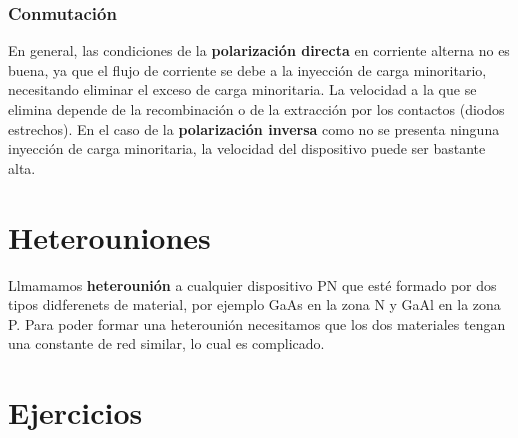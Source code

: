 \subsubsection{Conmutación}

En general, las condiciones de la \textbf{polarización directa} en corriente alterna no es buena, ya que el flujo de corriente se debe a la inyección de carga minoritario, necesitando eliminar el exceso de carga minoritaria. La velocidad a la que se elimina depende de la recombinación o de la extracción por los contactos (diodos estrechos). En el caso de la \textbf{polarización inversa} como no se presenta ninguna inyección de carga minoritaria, la velocidad del dispositivo puede ser bastante alta. 



\section{Heterouniones}

Llmamamos \textbf{heterounión} a cualquier dispositivo PN que esté formado por dos tipos didferenets de material, por ejemplo GaAs en la zona N y GaAl en la zona P. Para poder formar una heterounión necesitamos que los dos materiales tengan una constante de red similar, lo cual es complicado. 






\newpage

\section{Ejercicios}

